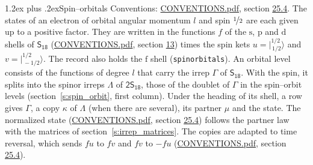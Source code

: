 \documentclass[10pt,a4paper]{article}
\makeatletter
\renewcommand\section{\@startsection{section}{1}{\z@}{-3ex plus -1ex minus -.2ex}%
  {1.2ex plus .2ex}{\normalfont\large\sffamily\bfseries\color{parttitle}}}
\numberwithin{equation}{section}
\newcommand{\grp}[1]{\mathsf{#1}}
\newcommand{\orbital}[1]{\mathrm{#1}}
\newcommand{\mult}{\kappa}
\newcommand{\intx}{\mu}
\newcommand{\jm}[2]{\bigl\lvert{}^{#1}_{\,#2}\bigr\rangle}
\makeatother
\begin{document}
\section{Spin--orbitals}\label{s:spin_orbitals}
Conventions: \href{../../CONVENTIONS.pdf}{CONVENTIONS.pdf}, section \href{../../CONVENTIONS.pdf\#conv.25.4}{25.4}.
\leavevmode\label{n:index.orbital.l}The states of an electron of orbital angular momentum $l$ and spin $\nicefrac{1}{2}$ are each given up to a positive factor. \label{n:local.spinor.uv}\label{n:local.function.f}They are written in the functions $f$ of the $\orbital{s}$, $\orbital{p}$ and $\orbital{d}$ shells of \href{../../../rotation/data/pdf/S18.pdf}{$\grp{S_{18}}$} (\href{../../CONVENTIONS.pdf}{CONVENTIONS.pdf}, section \href{../../../rotation/CONVENTIONS.pdf\#conv.13}{13}) times the spin kets $u = \jm{1/2}{1/2}$ and $v = \jm{1/2}{-1/2}$. The record also holds the $\orbital{f}$ shell (\texttt{spinorbitals}). An orbital level consists of the functions of degree $l$ that carry the irrep $\Gamma$ of \href{../../../rotation/data/pdf/S18.pdf}{$\grp{S_{18}}$}. With the spin, it splits into the spinor irreps $\Lambda$ of $\grp{2S_{18}}$, those of the doublet of $\Gamma$ in the spin--orbit levels (section~\ref{s:spin_orbit}, first column). \label{n:head.state}Under the heading of its shell, a row gives $\Gamma$, a copy $\mult$ of $\Lambda$ (when there are several), its partner $\intx$ and the state. The normalized state (\href{../../CONVENTIONS.pdf}{CONVENTIONS.pdf}, section \href{../../CONVENTIONS.pdf\#conv.25.4}{25.4}) follows the partner law with the matrices of section~\ref{s:irrep_matrices}. The copies are adapted to time reversal, which sends $f u$ to $f v$ and $f v$ to $-f u$ (\href{../../CONVENTIONS.pdf}{CONVENTIONS.pdf}, section \href{../../CONVENTIONS.pdf\#conv.25.4}{25.4}).
\end{document}
